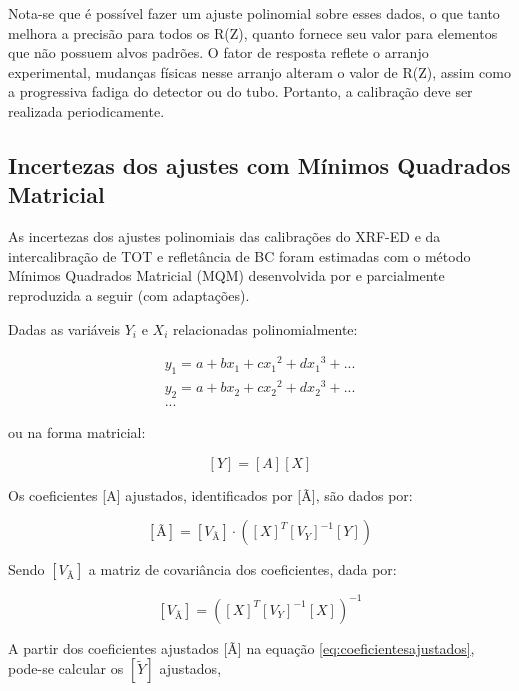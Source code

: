 Nota-se que é possível fazer um ajuste polinomial sobre esses dados, 
o que tanto melhora a precisão para todos os R(Z), quanto fornece seu valor
para elementos que não possuem alvos padrões. O fator de resposta reflete 
o arranjo experimental, mudanças físicas
nesse arranjo alteram o valor de R(Z), assim como a progressiva fadiga do detector
ou do tubo. Portanto, a calibração deve ser realizada periodicamente.

\subsection{Incertezas dos ajustes com Mínimos Quadrados Matricial}

As incertezas dos ajustes polinomiais das calibrações do XRF-ED e da 
intercalibração de TOT e refletância de BC foram estimadas com o método 
Mínimos Quadrados Matricial (MQM) desenvolvida por \citet{helene2006}
e parcialmente reproduzida a seguir (com adaptações).

Dadas as variáveis $Y_i$ e $X_i$ relacionadas polinomialmente:

\begin{equation}
  \label{eq:polinomio}
  \begin{split}
    y_1 = a + b x_1 + c{x_1}^2 + d{x_1}^3 + ...\\
    y_2 = a + b x_2 + c{x_2}^2 + d{x_2}^3 + ... \\
    ...
  \end{split}
\end{equation}

ou na forma matricial:

\begin{equation}
  \label{eq:polinomioMatriz}
  [Y] = [A][X]
\end{equation}

Os coeficientes [A] ajustados, identificados por [Ã], são dados por:

\begin{equation}
  \label{eq:coeficientesajustados}
  [Ã] = [V_{Ã}] \cdot ([X]^T {[V_Y]}^{-1} [Y])
\end{equation}

Sendo $[V_{Ã}]$ a matriz de covariância dos coeficientes, dada por:

\begin{equation}
  \label{eq:matrizcovariancia}
  [V_{Ã}] = ([X]^T [V_Y]^{-1} [X])^{-1}
\end{equation}

A partir dos coeficientes ajustados [Ã] na equação \ref{eq:coeficientesajustados},
pode-se calcular os $[\tilde{Y}]$ ajustados,

